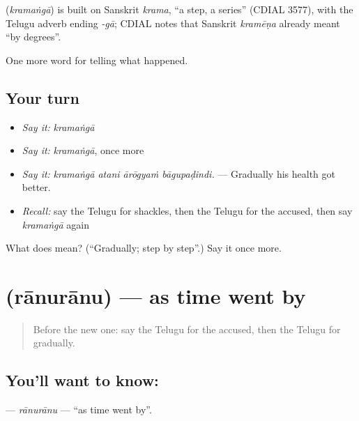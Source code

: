 \begin{cousinweb}
\textbf{} (\emph{kramaṅgā}) is built on Sanskrit \emph{krama}, \textquotedblleft{}a step, a series\textquotedblright{} (CDIAL 3577), with the Telugu adverb ending \emph{-gā}; CDIAL notes that Sanskrit \emph{kramēṇa} already meant \textquotedblleft{}by degrees\textquotedblright{}.
\end{cousinweb}

\begin{grammarlens}[title={What you've built}]
One more word for telling what happened.
\end{grammarlens}

\subsection*{Your turn}
\begin{itemize}
\raggedright
  \item \emph{Say it:} \emph{kramaṅgā}
  \item \emph{Say it:} \emph{kramaṅgā}, once more
  \item \emph{Say it:} \emph{kramaṅgā atani ārōgyaṁ bāgupaḍindi.} — Gradually his health got better.
  \item \emph{Recall:} say the Telugu for shackles, then the Telugu for the accused, then say \emph{kramaṅgā} again
\end{itemize}

\begin{tcolorbox}[breakable,colback=teal!4,colframe=teal!35!black,title={Before you move on}]
What does  mean? (\textquotedblleft{}Gradually; step by step\textquotedblright{}.) Say it once more.
\end{tcolorbox}
\section[\texorpdfstring{\te{రానురాను} (rānurānu)}{రానురాను (rānurānu)}]{ (rānurānu) — as time went by}

\label{lesson:TE-C338-ranuranu}



\begin{quote}
Before the new one: say the Telugu for the accused, then the Telugu for gradually.
\end{quote}

\subsection*{You'll want to know: }
\textbf{} — \emph{rānurānu} — \textquotedblleft{}as time went by\textquotedblright{}.

